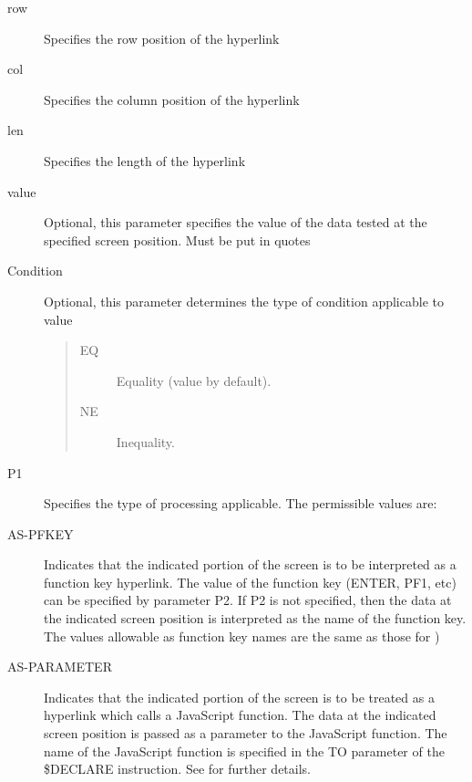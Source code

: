 \documentclass[letterpaper,10pt,english]{sphinxmanual}
\begin{document}
\begin{description}
\item[{row}] \leavevmode
Specifies the row position of the hyperlink

\item[{col}] \leavevmode
Specifies the column position of the hyperlink

\item[{len}] \leavevmode
Specifies the length of the hyperlink

\item[{value}] \leavevmode
Optional, this parameter specifies the value of the data tested at the specified screen position. Must be put in quotes

\item[{Condition}] \leavevmode
Optional, this parameter determines the type of condition applicable to value
\begin{quote}
\begin{description}
\item[{EQ}] \leavevmode
Equality (value by default).

\item[{NE}] \leavevmode
Inequality.

\end{description}
\end{quote}

\item[{P1}] \leavevmode
Specifies the type of processing applicable. The permissible values are:

\item[{AS-PFKEY}] \leavevmode
Indicates that the indicated portion of the screen is to be interpreted as a function key hyperlink. The value of the function key (ENTER, PF1, etc) can be specified by parameter P2. If P2 is not specified, then the data at the indicated screen position is interpreted as the name of the function key. The values allowable as function key names are the same as those for {\hyperref[\detokenize{User_Guide:v457ug-pfkfield}]{}})

\item[{AS-PARAMETER}] \leavevmode
Indicates that the indicated portion of the screen is to be treated as a hyperlink which calls a JavaScript function. The data at the indicated screen position is passed as a parameter to the JavaScript function. The name of the JavaScript function is specified in the TO parameter of the \$DECLARE instruction. See {\hyperref[\detokenize{User_Guide:v457ug-javascript-functions}]{}} for further details.


\end{description}
\end{document}
